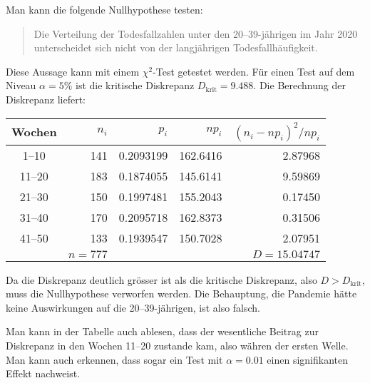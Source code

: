 \begin{loesung}
Man kann die folgende Nullhypothese testen:
\begin{quote}
Die Verteilung der Todesfallzahlen unter den 20--39-jährigen im Jahr
2020 unterscheidet sich nicht von der langjährigen Todesfallhäufigkeit.
\end{quote}
Diese Aussage kann mit einem $\chi^2$-Test getestet werden.
Für einen Test auf dem Niveau $\alpha=5\%$ ist die kritische 
Diskrepanz $D_{\text{krit}}=9.488$.
Die Berechnung der Diskrepanz liefert:
\begin{center}
\begin{tabular}{|c|rr|rr|}
\hline
Wochen           &  $n_i$& $p_i$     & $np_i$   & $(n_i-np_i)^2/np_i$  \\
\hline
\phantom{0}1--10 &   141 & 0.2093199 & 162.6416 &  2.87968 \\
11--20           &   183 & 0.1874055 & 145.6141 &  9.59869 \\
21--30           &   150 & 0.1997481 & 155.2043 &  0.17450 \\
31--40           &   170 & 0.2095718 & 162.8373 &  0.31506 \\
41--50           &   133 & 0.1939547 & 150.7028 &  2.07951 \\
\hline
                 &$n=777$&           &          &$D= 15.04747$\\
\hline
\end{tabular}
\end{center}
Da die Diskrepanz deutlich grösser ist als die kritische Diskrepanz,
also $D>D_{\text{krit}}$, muss die Nullhypothese verworfen werden.
Die Behauptung, die Pandemie hätte keine Auswirkungen auf die
20--39-jährigen, ist also falsch.

Man kann in der Tabelle auch ablesen, dass der wesentliche Beitrag
zur Diskrepanz in den Wochen 11--20 zustande kam, also währen der
ersten Welle.
Man kann auch erkennen, dass sogar ein Test mit $\alpha=0.01$ 
einen signifikanten Effekt nachweist.
\end{loesung}


